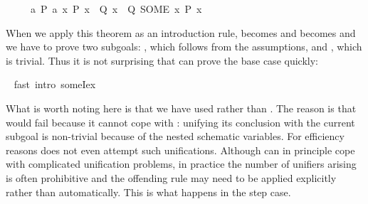 \begin{isabellebody}
\begin{isamarkuptxt}
\begin{isabelle}
\ \ \ \ \ {\isasymlbrakk}{\isasymexists}a{\isachardot}\ {\isacharquery}P\ a{\isacharsemicolon}\ {\isasymAnd}x{\isachardot}\ {\isacharquery}P\ x\ {\isasymLongrightarrow}\ {\isacharquery}Q\ x{\isasymrbrakk}\ {\isasymLongrightarrow}\ {\isacharquery}Q\ {\isacharparenleft}SOME\ x{\isachardot}\ {\isacharquery}P\ x{\isacharparenright}%
\end{isabelle}
When we apply this theorem as an introduction rule,  becomes
 and  becomes  and we have to prove
two subgoals: , which follows from the assumptions, and
, which is trivial. Thus it is not surprising that
 can prove the base case quickly:%
\end{isamarkuptxt}%
\isamarkuptrue%
\ \isamarkupfalse%
{\isacharparenleft}fast\ intro{\isacharcolon}\ someI{}{\isacharunderscore}ex{\isacharparenright}%
\begin{isamarkuptxt}%
\noindent
What is worth noting here is that we have used  rather than
.  The reason is that  would fail because it cannot
cope with : unifying its conclusion with the current
subgoal is non-trivial because of the nested schematic variables. For
efficiency reasons  does not even attempt such unifications.
Although  can in principle cope with complicated unification
problems, in practice the number of unifiers arising is often prohibitive and
the offending rule may need to be applied explicitly rather than
automatically. This is what happens in the step case.


\end{isamarkuptxt}
\end{isabellebody}
